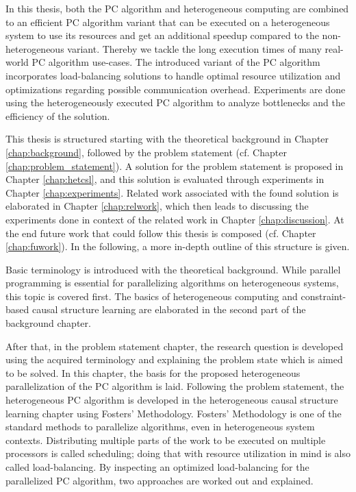 In this thesis, both the PC algorithm and heterogeneous computing are combined to an efficient PC algorithm variant that can be executed on a heterogeneous system to use its resources and get an additional speedup compared to the non-heterogeneous variant. Thereby we tackle the long execution times of many real-world PC algorithm use-cases. The introduced variant of the PC algorithm incorporates load-balancing solutions to handle optimal resource utilization and optimizations regarding possible communication overhead. Experiments are done using the heterogeneously executed PC algorithm to analyze bottlenecks and the efficiency of the solution.

This thesis is structured starting with the theoretical background in Chapter \ref{chap:background}, followed by the problem statement (cf. Chapter \ref{chap:problem_statement}). A solution for the problem statement is proposed in Chapter \ref{chap:hetcsl}, and this solution is evaluated through experiments in Chapter \ref{chap:experiments}. Related work associated with the found solution is elaborated in Chapter \ref{chap:relwork}, which then leads to discussing the experiments done in context of the related work in Chapter \ref{chap:discussion}. At the end future work that could follow this thesis is composed (cf. Chapter \ref{chap:fuwork}). In the following, a more in-depth outline of this structure is given.

Basic terminology is introduced with the theoretical background. While parallel programming is essential for parallelizing algorithms on heterogeneous systems, this topic is covered first. The basics of heterogeneous computing and constraint-based causal structure learning are elaborated in the second part of the background chapter.

After that, in the problem statement chapter, the research question is developed using the acquired terminology and explaining the problem state which is aimed to be solved. In this chapter, the basis for the proposed heterogeneous parallelization of the PC algorithm is laid. Following the problem statement, the heterogeneous PC algorithm is developed in the heterogeneous causal structure learning chapter using Fosters' Methodology. Fosters' Methodology is one of the standard methods to parallelize algorithms, even in heterogeneous system contexts. Distributing multiple parts of the work to be executed on multiple processors is called scheduling; doing that with resource utilization in mind is also called load-balancing. By inspecting an optimized load-balancing for the parallelized PC algorithm, two approaches are worked out and explained.

